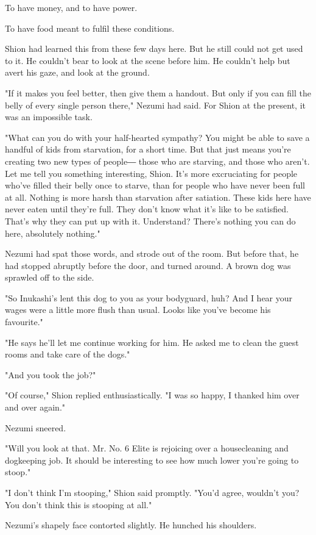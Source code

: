 To have money, and to have power.

To have food meant to fulfil these conditions.

Shion had learned this from these few days here. But he still could not
get used to it. He couldn't bear to look at the scene before him. He
couldn't help but avert his gaze, and look at the ground.

"If it makes you feel better, then give them a handout. But only if you
can fill the belly of every single person there," Nezumi had said. For
Shion at the present, it was an impossible task.

"What can you do with your half-hearted sympathy? You might be able to
save a handful of kids from starvation, for a short time. But that just
means you're creating two new types of people― those who are starving,
and those who aren't. Let me tell you something interesting, Shion. It's
more excruciating for people who've filled their belly once to starve,
than for people who have never been full at all. Nothing is more harsh
than starvation after satiation. These kids here have never eaten until
they're full. They don't know what it's like to be satisfied. That's why
they can put up with it. Understand? There's nothing you can do here,
absolutely nothing."

Nezumi had spat those words, and strode out of the room. But before
that, he had stopped abruptly before the door, and turned around. A
brown dog was sprawled off to the side.

"So Inukashi's lent this dog to you as your bodyguard, huh? And I hear
your wages were a little more flush than usual. Looks like you've become
his favourite."

"He says he'll let me continue working for him. He asked me to clean the
guest rooms and take care of the dogs."

"And you took the job?"

"Of course," Shion replied enthusiastically. "I was so happy, I thanked
him over and over again."

Nezumi sneered.

"Will you look at that. Mr. No. 6 Elite is rejoicing over a
housecleaning and dogkeeping job. It should be interesting to see how
much lower you're going to stoop."

"I don't think I'm stooping," Shion said promptly. "You'd agree,
wouldn't you? You don't think this is stooping at all."

Nezumi's shapely face contorted slightly. He hunched his shoulders.

